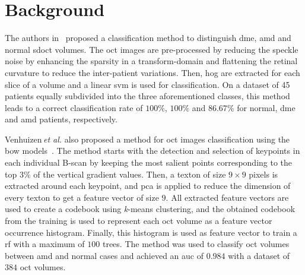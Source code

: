 
\section{Background}
The authors in~\cite{Srinivasan2014} proposed a classification method to distinguish \ac{dme}, \ac{amd} and normal \ac{sdoct} volumes.
The \ac{oct} images are pre-processed by reducing the speckle noise by enhancing the sparsity in a transform-domain and flattening the retinal curvature to reduce the inter-patient variations.
Then, \ac{hog} are extracted for each slice of a volume and a linear \ac{svm} is used for classification. 
On a dataset of 45 patients equally subdivided into the three aforementioned classes, this method leads to a correct classification rate of $100 \%$, $100 \%$ and $86.67 \%$ for normal, \ac{dme} and \ac{amd} patients, respectively.

Venhuizen\,\textit{et al.} also proposed a method for \ac{oct} images classification using the \ac{bow} models~\cite{Venhuizen2015}.
The method starts with the detection and selection of keypoints in each individual B-scan by keeping the most salient points corresponding to the top $3 \%$ of the vertical gradient values. Then, a texton of size $9 \times 9$ pixels is extracted around each keypoint, and \ac{pca} is applied to reduce the dimension of every texton to get a feature vector of size $9$. 
All extracted feature vectors are used to create a codebook using \textit{k}-means clustering, and the obtained codebook from the training is used to represent each \ac{oct} volume as a feature vector occurrence histogram. 
Finally, this histogram is used as feature vector to train a \ac{rf} with a maximum of $100$ trees.
The method was used to classify \ac{oct} volumes between \ac{amd} and normal cases and achieved an \ac{auc} of $0.984$ with a dataset of $384$ \ac{oct} volumes. 

